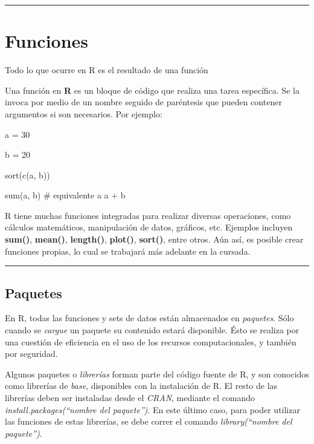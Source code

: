 \documentclass[
  spanish,
  letterpaper,
  DIV=11,
  numbers=noendperiod]{scrreprt}
\newenvironment{Shaded}{\begin{snugshade}}{\end{snugshade}}
\newcommand{\CommentTok}[1]{\textcolor[rgb]{0.37,0.37,0.37}{#1}}
\newcommand{\DecValTok}[1]{\textcolor[rgb]{0.68,0.00,0.00}{#1}}
\newcommand{\FunctionTok}[1]{\textcolor[rgb]{0.28,0.35,0.67}{#1}}
\newcommand{\NormalTok}[1]{\textcolor[rgb]{0.00,0.23,0.31}{#1}}
\newcommand{\OtherTok}[1]{\textcolor[rgb]{0.00,0.23,0.31}{#1}}
\begin{document}
\begin{center}\rule{0.5\linewidth}{0.5pt}\end{center}

\section{Funciones}\label{funciones}

Todo lo que ocurre en R es el resultado de una función

Una función en \textbf{R} es un bloque de código que realiza una tarea
específica. Se la invoca por medio de un nombre seguido de paréntesis
que pueden contener argumentos si son necesarios. Por ejemplo:

\begin{Shaded}
\begin{Highlighting}[]

\NormalTok{a }\OtherTok{=} \DecValTok{30}

\NormalTok{b }\OtherTok{=} \DecValTok{20}

\FunctionTok{sort}\NormalTok{(}\FunctionTok{c}\NormalTok{(a, b))}

\FunctionTok{sum}\NormalTok{(a, b) }\CommentTok{\# equivalente a \textquotesingle{}a + b\textquotesingle{}}
\end{Highlighting}
\end{Shaded}

R tiene muchas funciones integradas para realizar diversas operaciones,
como cálculos matemáticos, manipulación de datos, gráficos, etc.
Ejemplos incluyen \textbf{sum()}, \textbf{mean()}, \textbf{length()},
\textbf{plot()}, \textbf{sort()}, entre otros. Aún así, es posible crear
funciones propias, lo cual se trabajará más adelante en la cursada.

\begin{center}\rule{0.5\linewidth}{0.5pt}\end{center}

\subsection{Paquetes}\label{paquetes}

En R, todas las funciones y sets de datos están almacenados en
\emph{paquetes}. Sólo cuando se \emph{cargue} un paquete su contenido
estará disponible. Ésto se realiza por una cuestión de eficiencia en el
uso de los recursos computacionales, y también por seguridad.

Algunos paquetes o \emph{librerías} forman parte del código fuente de R,
y son conocidos como librerías de \emph{base}, disponibles con la
instalación de R. El resto de las librerías deben ser instaladas desde
el \emph{CRAN}, mediante el comando \emph{install.packages(``nombre del
paquete'')}. En este último caso, para poder utilizar las funciones de
estas librerías, se debe correr el comando \emph{library(``nombre del
paquete'')}.
\end{document}
